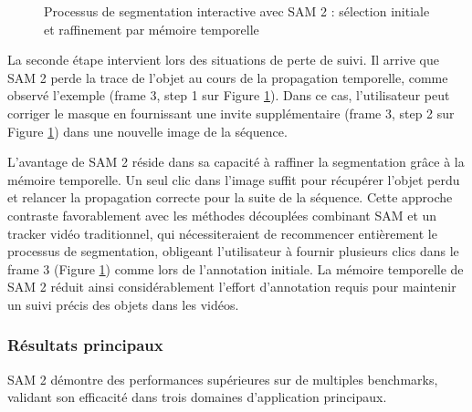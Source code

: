\begin{figure}[H]
    \centering
    \caption{Processus de segmentation interactive avec SAM 2 : sélection initiale et raffinement par mémoire temporelle \cite{ravi_sam_2024}}
    \label{fig:ch2_sam2_12_entrainement_sam2}
\end{figure}

La seconde étape intervient lors des situations de perte de suivi. Il arrive que SAM 2 perde la trace de l'objet au cours de la propagation temporelle, comme observé l'exemple (frame 3, step 1 sur Figure \ref{fig:ch2_sam2_12_entrainement_sam2}). Dans ce cas, l'utilisateur peut corriger le masque en fournissant une invite supplémentaire (frame 3, step 2 sur Figure \ref{fig:ch2_sam2_12_entrainement_sam2}) dans une nouvelle image de la séquence.

L'avantage de SAM 2 réside dans sa capacité à raffiner la segmentation grâce à la mémoire temporelle. Un seul clic dans l'image suffit pour récupérer l'objet perdu et relancer la propagation correcte pour la suite de la séquence. Cette approche contraste favorablement avec les méthodes découplées combinant SAM et un tracker vidéo traditionnel, qui nécessiteraient de recommencer entièrement le processus de segmentation, obligeant l'utilisateur à fournir plusieurs clics dans le frame 3 (Figure \ref{fig:ch2_sam2_12_entrainement_sam2}) comme lors de l'annotation initiale. La mémoire temporelle de SAM 2 réduit ainsi considérablement l'effort d'annotation requis pour maintenir un suivi précis des objets dans les vidéos.

\subsubsection{Résultats principaux}
SAM 2 démontre des performances supérieures sur de multiples benchmarks, validant son efficacité dans trois domaines d'application principaux.

